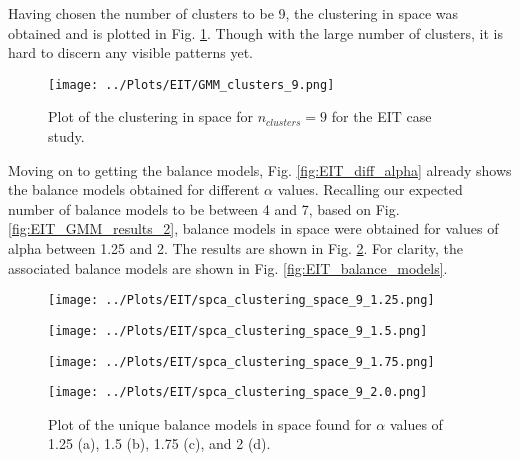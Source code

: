 \documentclass[12pt]{report} %
\begin{document}
Having chosen the number of clusters to be 9, the clustering in space was obtained and is plotted in Fig. \ref{fig:EIT_clustering}. Though with the large number of clusters, it is hard to discern any visible patterns yet.

\begin{figure}[htbp]
  \centering
  \texttt{[image: ../Plots/EIT/GMM\_clusters\_9.png]}
  \caption{Plot of the clustering in space for $n_{clusters}=9$ for the EIT case study.}
  \label{fig:EIT_clustering}
\end{figure}

Moving on to getting the balance models, Fig. \ref{fig:EIT_diff_alpha} already shows the balance models obtained for different $\alpha$ values. Recalling our expected number of balance models to be between 4 and 7, based on Fig. \ref{fig:EIT_GMM_results_2}, balance models in space were obtained for values of alpha between 1.25 and 2. The results are shown in Fig. \ref{fig:EIT_balance_models_space}. For clarity, the associated balance models are shown in Fig. \ref{fig:EIT_balance_models}.

\begin{figure}[htbp]
  \centering
  \begin{minipage}{0.75\textwidth}
    \centering
    \texttt{[image: ../Plots/EIT/spca\_clustering\_space\_9\_1.25.png]}
    \subcaption{}
  \end{minipage}

  \begin{minipage}{0.75\textwidth}
    \centering
    \texttt{[image: ../Plots/EIT/spca\_clustering\_space\_9\_1.5.png]}
    \subcaption{}
  \end{minipage}

  \begin{minipage}{0.75\textwidth}
    \centering
    \texttt{[image: ../Plots/EIT/spca\_clustering\_space\_9\_1.75.png]}
    \subcaption{}
  \end{minipage}

  \begin{minipage}{0.75\textwidth}
    \centering
    \texttt{[image: ../Plots/EIT/spca\_clustering\_space\_9\_2.0.png]}
    \subcaption{}
  \end{minipage}

  \caption{Plot of the unique balance models in space found for $\alpha$ values of 1.25 (a), 1.5 (b), 1.75 (c), and 2 (d).}
  \label{fig:EIT_balance_models_space}
\end{figure}
\end{document}

